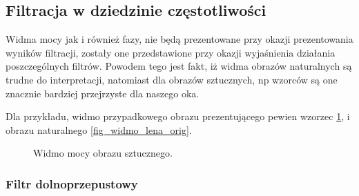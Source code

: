 \documentclass{classrep}
\begin{document}
\subsection{Filtracja w dziedzinie częstotliwości}

Widma mocy jak i również fazy, nie będą prezentowane przy okazji prezentowania wyników filtracji, zostały one przedstawione przy okazji wyjaśnienia działania poszczególnych filtrów. Powodem tego jest fakt, iż widma obrazów naturalnych są trudne do interpretacji, natomiast dla obrazów sztucznych, np wzorców są one znacznie bardziej przejrzyste dla naszego oka.

Dla przykładu, widmo przypadkowego obrazu prezentującego pewien wzorzec \ref{fig_pattern}, i obrazu naturalnego \ref{fig_widmo_lena_orig}.

 \begin{figure}[H]
  \centering
  \caption{Widmo mocy obrazu sztucznego.}
  \label{fig_pattern}
\end{figure}




\subsubsection{Filtr dolnoprzepustowy}
\end{document}
